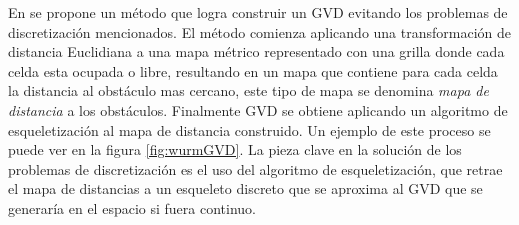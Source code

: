 En \cite{wurm2008coordinated} se propone un método que logra construir un GVD evitando los problemas de discretización mencionados. El método comienza aplicando una transformación de distancia Euclidiana \cite{meijster2002general} a una mapa métrico representado con una grilla donde cada celda esta ocupada o libre, resultando en un mapa que contiene para cada celda la distancia al obstáculo mas cercano, este tipo de mapa se denomina \emph{mapa de distancia} a los obstáculos. Finalmente GVD se obtiene aplicando un algoritmo de esqueletización \cite{wan2008distance} al mapa de distancia construido. Un ejemplo de este proceso se puede ver en la figura \ref{fig:wurmGVD}. La pieza clave en la solución de los problemas de discretización es el uso del algoritmo de esqueletización, que retrae el mapa de distancias a un esqueleto discreto que se aproxima al GVD que se generaría en el espacio si fuera continuo.   
